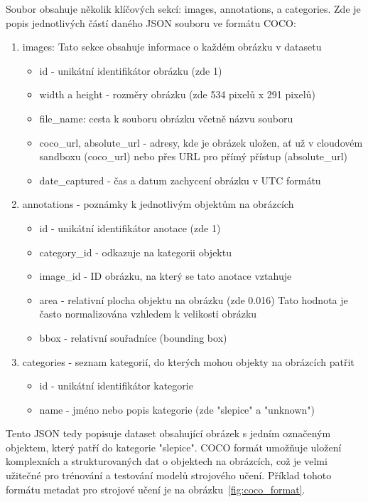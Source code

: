 Soubor obsahuje několik klíčových sekcí: images, annotations, a categories.\newline
Zde je popis jednotlivých částí daného JSON souboru ve formátu COCO:
\begin{enumerate}
    \item images: Tato sekce obsahuje informace o každém obrázku v datasetu
    \begin{itemize}
        \item id - unikátní identifikátor obrázku (zde 1)
        \item width a height - rozměry obrázku (zde 534 pixelů x 291 pixelů)
        \item file\_name: cesta k souboru obrázku včetně názvu souboru
        \item coco\_url, absolute\_url - adresy, kde je obrázek uložen, ať už v cloudovém sandboxu (coco\_url) nebo přes URL pro přímý přístup (absolute\_url)
        \item date\_captured - čas a datum zachycení obrázku v UTC formátu
    \end{itemize}
    \item annotations - poznámky k jednotlivým objektům na obrázcích
    \begin{itemize}
        \item id - unikátní identifikátor anotace (zde 1)
        \item category\_id - odkazuje na kategorii objektu
        \item image\_id - ID obrázku, na který se tato anotace vztahuje
        \item area - relativní plocha objektu na obrázku (zde 0.016)
        Tato hodnota je často normalizována vzhledem k velikosti obrázku
        \item bbox - relativní souřadníce (bounding box)
    \end{itemize}
    \item categories - seznam kategorií, do kterých mohou objekty na obrázcích patřit
    \begin{itemize}
        \item id - unikátní identifikátor kategorie
        \item name - jméno nebo popis kategorie (zde "slepice" a "unknown")
    \end{itemize}
\end{enumerate}

Tento JSON tedy popisuje dataset obsahující obrázek s jedním označeným objektem, který patří do kategorie "slepice".
COCO formát umožňuje uložení komplexních a strukturovaných dat o objektech na obrázcích, což je velmi užitečné pro trénování a testování modelů strojového učení.
Příklad tohoto formátu metadat pro strojové učení je na obrázku~\ref{fig:coco_format}.

